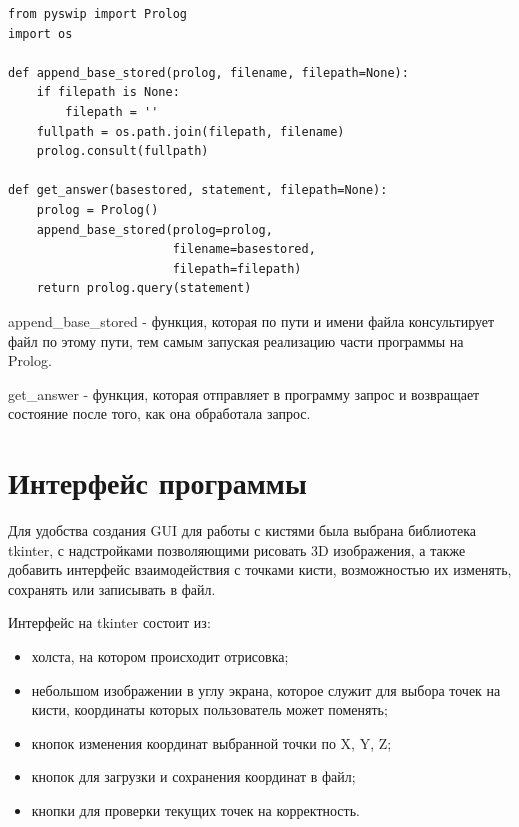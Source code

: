 \begin{lstlisting}[caption=Взаимодействие python и Prolog, label=rules:PythonProlog]
from pyswip import Prolog
import os

def append_base_stored(prolog, filename, filepath=None):
    if filepath is None:
        filepath = ''    
    fullpath = os.path.join(filepath, filename)
    prolog.consult(fullpath)
    
def get_answer(basestored, statement, filepath=None):
    prolog = Prolog()
    append_base_stored(prolog=prolog, 
                       filename=basestored,
                       filepath=filepath)
    return prolog.query(statement)

\end{lstlisting}

\hspace{0.6cm} append\_base\_stored - функция, которая по пути и имени файла консультирует файл по этому пути, тем самым запуская реализацию части программы на Prolog.

\hspace{0.6cm} get\_answer - функция, которая отправляет в программу запрос и возвращает состояние после того, как она обработала запрос.

\section{Интерфейс программы}
\hspace{0.6cm} Для удобства создания GUI для работы с кистями была выбрана библиотека tkinter, с надстройками позволяющими рисовать 3D изображения, а также добавить интерфейс взаимодействия с точками кисти, возможностью их изменять, сохранять или записывать в файл.

\hspace{0.6cm} Интерфейс на tkinter состоит из:
\begin{itemize}
	\item холста, на котором происходит отрисовка;
	\item небольшом изображении в углу экрана, которое служит для выбора точек на кисти, координаты которых пользователь может поменять;
	\item кнопок изменения координат выбранной точки по X, Y, Z;
	\item кнопок для загрузки и сохранения координат в файл;
	\item кнопки для проверки текущих точек на корректность.
\end{itemize}

